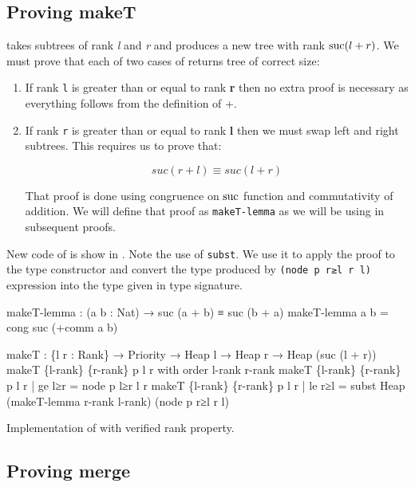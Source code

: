 \subsection{Proving makeT}

\makeT takes subtrees of rank \textit{l} and \textit{r} and produces a new tree with rank $\operatorname{suc}(l + r)$. We must prove that each of two cases of \makeT returns tree of correct size:

\begin{enumerate}
 \item If rank \texttt{l} is greater than or equal to rank \textbf{r} then no extra proof is necessary as everything follows from the definition of +.
 \item If rank \texttt{r} is greater than or equal to rank \textbf{l} then we must swap left and right subtrees. This requires us to prove that:

\begin{equation*}
suc (r + l) ≡ suc (l + r)
\end{equation*}

That proof is done using congruence on $\operatorname{suc}$ function and commutativity of addition. We will define that proof as \texttt{makeT-lemma} as we will be using in subsequent proofs.
\end{enumerate}
\noindent
New code of \makeT is show in . Note the use of \texttt{subst}. We use it to apply the proof to the \Heap type constructor and convert the type produced by \texttt{(node p r≥l r l)} expression into the type given in type signature. %

\begin{listing}[thb!]
\begin{code}
makeT-lemma : (a b : Nat) → suc (a + b) ≡ suc (b + a)
makeT-lemma a b = cong suc (+comm a b)

makeT : \{l r : Rank\} → Priority → Heap l → Heap r → Heap (suc (l + r))
makeT \{l-rank\} \{r-rank\} p l r with order l-rank r-rank
makeT \{l-rank\} \{r-rank\} p l r | ge l≥r
  = node p l≥r l r
makeT \{l-rank\} \{r-rank\} p l r | le r≥l
  = subst Heap (makeT-lemma r-rank l-rank) (node p r≥l r l)
\end{code}
\caption{Implementation of \makeT with verified rank property.}\label{lst:rank-proof-makeT-two-pass}
\end{listing}

\subsection{Proving merge}


